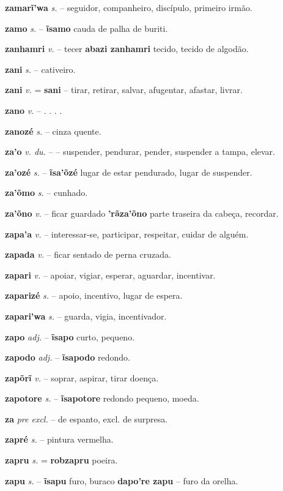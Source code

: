 \textbf{zamarĩ'wa} \textit{s.} -- seguidor, companheiro, discípulo, primeiro irmão.

\textbf{zamo} \textit{s.} -- \textbf{ĩsamo} cauda de palha de buriti.

\textbf{zanhamri} \textit{v.} -- tecer  \textbf{abazi zanhamri} tecido, tecido de algodão.

\textbf{zani} \textit{s.} -- cativeiro.

\textbf{zani} \textit{v.} = \textbf{sani} -- tirar, retirar, salvar, afugentar, afastar, livrar.

\textbf{zano} \textit{v.} -- . . . .

\textbf{zanozé} \textit{s.} -- cinza quente.

\textbf{za'o} \textit{v. du.} -- -- suspender, pendurar, pender, suspender a tampa, elevar.

\textbf{za'ozé} \textit{s.} -- \textbf{ĩsa'õzé} lugar de estar pendurado, lugar de suspender.

\textbf{za'õmo} \textit{s.} -- cunhado.

\textbf{za'õno} \textit{v.} -- ficar guardado  \textbf{'rãza'õno} parte traseira da cabeça, recordar.

\textbf{zapa'a} \textit{v.} -- interessar-se, participar, respeitar, cuidar de alguém.

\textbf{zapada} \textit{v.} -- ficar sentado de perna cruzada.

\textbf{zapari} \textit{v.} -- apoiar, vigiar, esperar, aguardar, incentivar.

\textbf{zaparizé} \textit{s.} -- apoio, incentivo, lugar de espera.

\textbf{zapari'wa} \textit{s.} -- guarda, vigia, incentivador.

\textbf{zapo} \textit{adj.} -- \textbf{ĩsapo} curto, pequeno.

\textbf{zapodo} \textit{adj.} -- \textbf{ĩsapodo} redondo.

\textbf{zapõrĩ} \textit{v.} -- soprar, aspirar, tirar doença.

\textbf{zapotore} \textit{s.} -- \textbf{ĩsapotore} redondo pequeno, moeda.

\textbf{za} \textit{pre excl.} -- de espanto, excl. de surpresa.

\textbf{zapré} \textit{s.} -- pintura vermelha.

\textbf{zapru} \textit{s.} = \textbf{robzapru} poeira.

\textbf{zapu} \textit{s.} -- \textbf{ĩsapu} furo, buraco  \textbf{dapo're zapu} -- furo da orelha.

